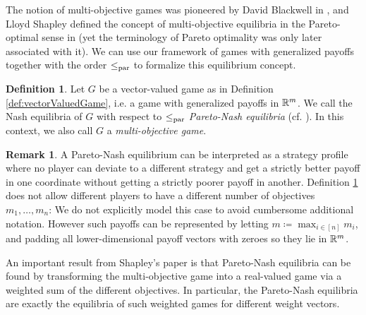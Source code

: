 \documentclass[a4paper,DIV=11,abstracton,twoside=semi]{scrreprt}
\theoremstyle{definition}
\newtheorem{defn}[thm]{Definition} %
\newtheorem{rem}[thm]{Remark}
\begin{document}
    The notion of multi-objective games was pioneered by David Blackwell in \cite{bib:blackwellVectorPayoffs}, and Lloyd Shapley defined the concept of multi-objective equilibria in the Pareto-optimal sense in \cite{bib:shapleyMultiobjectiveEquilibriumPoints} (yet the terminology of Pareto optimality was only later associated with it).
    We can use our framework of games with generalized payoffs together with the order $\leq_{\text{par}}$ to formalize this equilibrium concept.
    
    \begin{defn}
        \label{defn:multiObjectiveGame}
        Let $G$ be a vector-valued game as in Definition \ref{def:vectorValuedGame}, i.e. a game with generalized payoffs in $\mathbb{R}^m$.
        We call the Nash equilibria of $G$ with respect to $\leq_{\text{par}}$ \emph{Pareto-Nash equilibria} (cf. \cite{bib:paretoNashEquilibria}).
        In this context, we also call $G$ a \emph{multi-objective game}.
    \end{defn}

    \begin{rem}
        A Pareto-Nash equilibrium can be interpreted as a strategy profile where no player can deviate to a different strategy and get a strictly better payoff in one coordinate without getting a strictly poorer payoff in another. 
        Definition \ref{defn:multiObjectiveGame} does not allow different players to have a different number of objectives $m_1, \dots, m_n$: We do not explicitly model this case to avoid cumbersome additional notation. However such payoffs can be represented by letting $m \coloneqq \max_{i \in [n]} m_i$, and padding all lower-dimensional payoff vectors with zeroes so they lie in $\mathbb{R}^m$.
    \end{rem}

    An important result from Shapley's paper \cite{bib:shapleyMultiobjectiveEquilibriumPoints} is that Pareto-Nash equilibria can be found by transforming the multi-objective game into a real-valued game via a weighted sum of the different objectives. In particular, the Pareto-Nash equilibria are exactly the equilibria of such weighted games for different weight vectors.
    
\end{document}
